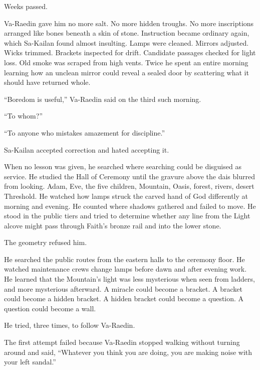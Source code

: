 Weeks passed.\par

Va-Raedin gave him no more salt. No more hidden troughs. No more inscriptions arranged like bones beneath a skin of stone. Instruction became ordinary again, which Sa-Kailan found almost insulting. Lamps were cleaned. Mirrors adjusted. Wicks trimmed. Brackets inspected for drift. Candidate passages checked for light loss. Old smoke was scraped from high vents. Twice he spent an entire morning learning how an unclean mirror could reveal a sealed door by scattering what it should have returned whole.\par

“Boredom is useful,” Va-Raedin said on the third such morning.\par

“To whom?”\par

“To anyone who mistakes amazement for discipline.”\par

Sa-Kailan accepted correction and hated accepting it.\par

When no lesson was given, he searched where searching could be disguised as service. He studied the Hall of Ceremony until the gravure above the dais blurred from looking. Adam, Eve, the five children, Mountain, Oasis, forest, rivers, desert Threshold. He watched how lamps struck the carved hand of God differently at morning and evening. He counted where shadows gathered and failed to move. He stood in the public tiers and tried to determine whether any line from the Light alcove might pass through Faith’s bronze rail and into the lower stone.\par

The geometry refused him.\par

He searched the public routes from the eastern halls to the ceremony floor. He watched maintenance crews change lamps before dawn and after evening work. He learned that the Mountain’s light was less mysterious when seen from ladders, and more mysterious afterward. A miracle could become a bracket. A bracket could become a hidden bracket. A hidden bracket could become a question. A question could become a wall.\par

He tried, three times, to follow Va-Raedin.\par

The first attempt failed because Va-Raedin stopped walking without turning around and said, “Whatever you think you are doing, you are making noise with your left sandal.”\par

